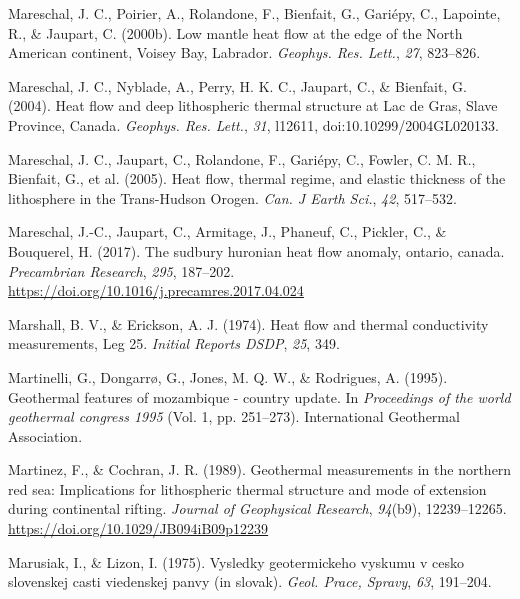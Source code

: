 \begin{CSLReferences}{1}{1}
\leavevmode{}%
Mareschal, J. C., Poirier, A., Rolandone, F., Bienfait, G., Gariépy, C., Lapointe, R., \& Jaupart, C. (2000b). Low mantle heat flow at the edge of the {North American} continent, {Voisey Bay, Labrador}. \emph{Geophys. Res. Lett.}, \emph{27}, 823--826.

\leavevmode{}%
Mareschal, J. C., Nyblade, A., Perry, H. K. C., Jaupart, C., \& Bienfait, G. (2004). Heat flow and deep lithospheric thermal structure at {Lac de Gras, Slave Province, Canada}. \emph{Geophys. Res. Lett.}, \emph{31}, l12611, doi:10.10299/2004GL020133.

\leavevmode{}%
Mareschal, J. C., Jaupart, C., Rolandone, F., Gariépy, C., Fowler, C. M. R., Bienfait, G., et al. (2005). Heat flow, thermal regime, and elastic thickness of the lithosphere in the {Trans-Hudson Orogen}. \emph{Can. J Earth Sci.}, \emph{42}, 517--532.

\leavevmode{}%
Mareschal, J.-C., Jaupart, C., Armitage, J., Phaneuf, C., Pickler, C., \& Bouquerel, H. (2017). The sudbury huronian heat flow anomaly, ontario, canada. \emph{Precambrian Research}, \emph{295}, 187--202. \url{https://doi.org/10.1016/j.precamres.2017.04.024}

\leavevmode{}%
Marshall, B. V., \& Erickson, A. J. (1974). Heat flow and thermal conductivity measurements, {Leg} 25. \emph{Initial Reports DSDP}, \emph{25}, 349.

\leavevmode{}%
Martinelli, G., Dongarrø, G., Jones, M. Q. W., \& Rodrigues, A. (1995). Geothermal features of mozambique - country update. In \emph{Proceedings of the world geothermal congress 1995} (Vol. 1, pp. 251--273). International Geothermal Association.

\leavevmode{}%
Martinez, F., \& Cochran, J. R. (1989). Geothermal measurements in the northern red sea: Implications for lithospheric thermal structure and mode of extension during continental rifting. \emph{Journal of Geophysical Research}, \emph{94}(b9), 12239--12265. \url{https://doi.org/10.1029/JB094iB09p12239}

\leavevmode{}%
Marusiak, I., \& Lizon, I. (1975). Vysledky geotermickeho vyskumu v cesko slovenskej casti viedenskej panvy (in slovak). \emph{Geol. Prace, Spravy}, \emph{63}, 191--204.


\end{CSLReferences}
